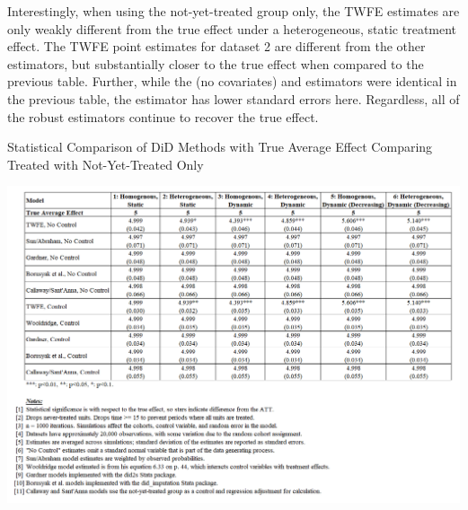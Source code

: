 \documentclass[12pt]{article}
\begin{document}
Interestingly, when using the not-yet-treated group only, the TWFE estimates are only weakly different from the true effect under a heterogeneous, static treatment effect. The TWFE point estimates for dataset 2 are different from the other estimators, but substantially closer to the true effect when compared to the previous table. Further, while the \citet{CS2021} (no covariates) and \citet{sunabr2021a} estimators were identical in the previous table, the \citet{CS2021} estimator has lower standard errors here. Regardless, all of the robust estimators continue to recover the true effect.
\begin{table}[H]
    \centering
    \caption{Statistical Comparison of DiD Methods with True Average Effect
Comparing Treated with Not-Yet-Treated Only}
    \includegraphics[width=6in]{Figures/Table 2.png}
    \label{tab:estimators-notyet}
\end{table}
\end{document}
